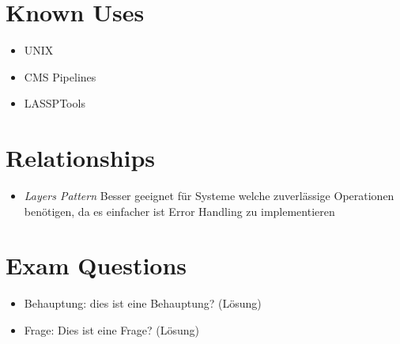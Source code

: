 \section{Known Uses}
\begin{itemize}
	\item UNIX
	\item CMS Pipelines
	\item LASSPTools
\end{itemize}

\section{Relationships}
\begin{itemize}
	\item \textit{Layers Pattern} Besser geeignet für Systeme welche zuverlässige Operationen benötigen, da es einfacher ist Error Handling zu implementieren
\end{itemize}

\section{Exam Questions}
\begin{itemize}
  \item Behauptung: dies ist eine Behauptung? (Lösung)
    \item Frage: Dies ist eine Frage? (Lösung)
\end{itemize}
